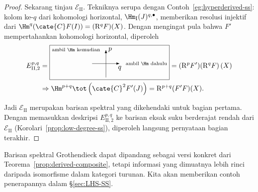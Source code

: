 \begin{proof}
	Sekarang tinjau $\mathscr{E}_{\mathrm{II}}$. Tekniknya serupa dengan
	Contoh~\ref{eg:hyperderived-ss}: kolom ke-$q$ dari kohomologi horizontal,
	$\Hm_{\mathrm{I}}(J)^{q,\bullet}$, memberikan resolusi injektif dari
	$\Hm^q(\cate{C}F(I))=(\mathrm{R}^qF)(X)$. Dengan mengingat pula bahwa $F'$
	mempertahankan kohomologi horizontal, diperoleh
	\begin{align*}
		E_{\mathrm{II},2}^{p, q} & =
		\begin{tikzpicture}[scale=0.7, baseline=(O)]
			\draw[-Latex] (0, -1) -- (0, 1) node[right] {$p$} node[left=0.5em] {\scriptsize\text{ambil $\Hm$ kemudian}};
			\draw[-Latex] (-1, 0) -- (1, 0) node[below] {$q$} node[right=0.5em] {\scriptsize\text{ambil $\Hm$ dahulu}};
			\coordinate (O) at (0, -0.3);
			\draw (current bounding box.north west) rectangle ([yshift=-1ex] current bounding box.south east);
		\end{tikzpicture}
		= (\mathrm{R}^p F')(\mathrm{R}^q F)\left( X \right) \\
		& \Rightarrow \Hm^{p+q}\tot\left(\cate{C}^2 F'(J)\right) = \mathrm{R}^{p+q}(F'F)(X).
	\end{align*}

	Jadi $\mathscr{E}_{\mathrm{II}}$ merupakan barisan spektral yang dikehendaki
	untuk bagian pertama. Dengan memasukkan deskripsi
	$E_{\mathrm{II},2}^{p,q}$ ke barisan eksak suku berderajat rendah dari
	$\mathscr{E}_{\mathrm{II}}$ (Korolari~\ref{prop:low-degree-ss}), diperoleh
	langsung pernyataan bagian terakhir.
\end{proof}

Barisan spektral Grothendieck dapat dipandang sebagai versi konkret dari
Teorema~\ref{prop:derived-composite}, tetapi informasi yang dimuatnya lebih
rinci daripada isomorfisme dalam kategori turunan. Kita akan memberikan contoh
penerapannya dalam \S\ref{sec:LHS-SS}.

